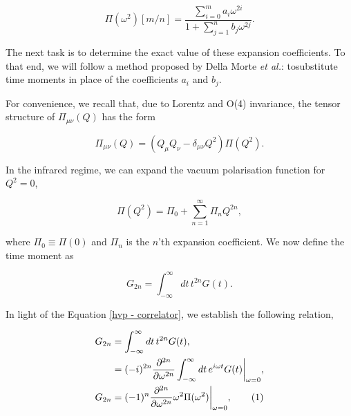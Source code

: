 \documentclass{article}
\numberwithin{equation}{section} %
\begin{document}
\begin{equation}
\Pi(\omega^2)[m/n] = \frac{\sum_{i=0}^ma_i\omega^{2i}}{1+\sum_{j=1}^nb_j\omega^{2j}}.
\end{equation}

The next task is to determine the exact value of these expansion coefficients. To that end, we will follow a method proposed by Della Morte \textit{et al.}: tosubstitute time moments in place of the coefficients $a_i$ and $b_j$.

For convenience, we recall that, due to Lorentz and O(4) invariance\cite{vector}, the tensor structure of $\Pi_{\mu\nu}(Q)$ has the form 

\begin{equation}
\Pi_{\mu\nu}(Q) = \left( Q_\mu Q_\nu - \delta_{\mu\nu} Q^2 \right)\Pi(Q^2).
\end{equation}

In the infrared regime, we can expand the vacuum polarisation function for $Q^2=0$,

\begin{equation}
\Pi(Q^2) = \Pi_0 + \sum_{n=1}^\infty \Pi_n Q^{2n},
\label{hvpf expansion}
\end{equation}

\noindent where $\Pi_0 \equiv \Pi(0)$ and $\Pi_n$ is the $n$'th expansion coefficient. We now define the time moment as


%
%

\begin{equation}
G_{2n} = \int^\infty_{-\infty} dt \, t^{2n} G(t).
\end{equation}

In light of the Equation \ref{hvp - correlator}, we establish the following relation,

\begin{align*}
G_{2n} &= \int^\infty_{-\infty} dt \, t^{2n} G(t),\\
&=  (-i)^{2n} \frac{\partial^{2n}}{\partial \omega^{2n}}\int^\infty_{-\infty} dt \,  e^{i\omega t} G(t) \bigg \vert_{\omega=0} ,\\
G_{2n}&=  (-1)^{n} \frac{\partial^{2n}}{\partial \omega^{2n}} \omega^2 \Pi(\omega^2)\bigg \vert_{\omega=0} ,
\tag{\refstepcounter{equation}\theequation}
\end{align*}
\end{document}
